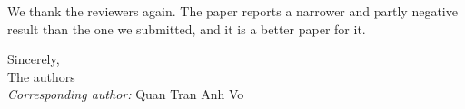 \documentclass[11pt,a4paper]{article}
\begin{document}
We thank the reviewers again. The paper reports a narrower and partly negative
result than the one we submitted, and it is a better paper for it.

\vspace{10pt}
Sincerely,\\[4pt]
The authors\\
\emph{Corresponding author:} Quan Tran Anh Vo
\end{document}
